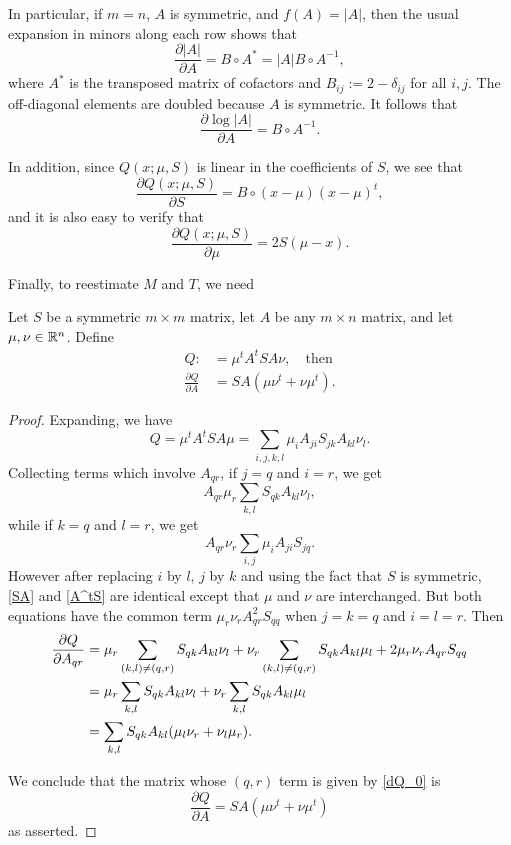 \documentclass[12pt,leqno]{article}
\begin{document}
In particular, if $m=n$, $A$ is symmetric, and $f(A) = |A|$,  then the usual expansion 
in minors along each row shows that 
$$
\frac{\partial{|A|}}{\partial{A}} = B\circ{A}^* = |A|B\circ{A}^{-1},
$$
where $A^*$ is the transposed matrix of cofactors and $B_{ij} := 2-\delta_{ij}$ for all $i,j$.
The off-diagonal elements are doubled because $A$ is symmetric.
It follows that
\begin{equation}\label{partial_logdet}
  \frac{\partial{\log|A|}}{\partial{A}} = B\circ{A}^{-1}. 
\end{equation}

In addition, since $Q(x;\mu,S)$ is linear in the coefficients of $S$, we see that
\begin{equation}\label{dQ_dS}
\frac{\partial{Q(x;\mu,S)}}{\partial{S}} = B\circ(x-\mu)(x-\mu)^t,
\end{equation}
and it is also easy to verify that
\begin{equation}\label{dQ_dmu}
\frac{\partial{Q(x;\mu,S)}}{\partial{\mu}} = 2S(\mu-x).
\end{equation}

Finally, to reestimate $M$ and $T$, we need

\begin{Lem}\label{dQdA}
  Let $S$ be a symmetric $m\times{m}$ matrix, let $A$ be any $m\times{n}$ matrix,
  and let $\mu,\nu\in {\mathbb R}^n$.  Define
  \begin{align*}
  Q :&= \mu^tA^tSA\nu,\quad\text{then}\\
  \frac{\partial{Q}}{\partial{A}} &= SA(\mu\nu^t+\nu\mu^t).
  \end{align*}
\end{Lem}
\begin{proof}
Expanding, we have
$$
Q = \mu^tA^tSA\mu = \sum_{i,j,k,l}\mu_iA_{ji}S_{jk}A_{kl}\nu_l.
$$
Collecting terms which involve $A_{qr}$, if $j=q$ and $i=r$, we get
\begin{equation}\label{SA}
A_{qr}\mu_r\sum_{k,l}S_{qk}A_{kl}\nu_l,
\end{equation}
while if $k=q$ and $l=r$, we get
\begin{equation}\label{A^tS}
A_{qr}\nu_r\sum_{i,j}\mu_iA_{ji}S_{jq}.
\end{equation}
However after replacing $i$ by $l$, $j$ by $k$ and using the fact that $S$ is symmetric,
\eqref{SA} and \eqref{A^tS} are identical except that $\mu$ and $\nu$ are interchanged.
But both equations have the common term
$\mu_r\nu_rA_{qr}^2S_{qq}$ when $j = k = q$ and $i = l = r$.
Then 
\begin{align}
  \notag\frac{\partial{Q}}{\partial{A_{qr}}} &= \mu_r\sum_{(k,l)\neq(q,r)}S_{qk}A_{kl}\nu_l
  +\nu_r\sum_{(k,l)\neq(q,r)}S_{qk}A_{kl}\mu_l+ 2\mu_r\nu_rA_{qr}S_{qq}\\
  &= \mu_r\sum_{k,l}S_{qk}A_{kl}\nu_l + \nu_r\sum_{k,l}S_{qk}A_{kl}\mu_l\notag\\
  &= \sum_{k,l}S_{qk}A_{kl}(\mu_l\nu_r + \nu_l\mu_r).\label{dQ_0}
\end{align}

We conclude that the matrix whose $(q,r)$ term is given by \eqref{dQ_0} is
$$
\frac{\partial{Q}}{\partial{A}} = SA(\mu\nu^t+\nu\mu^t)
$$
as asserted.
\end{proof}
\end{document}
